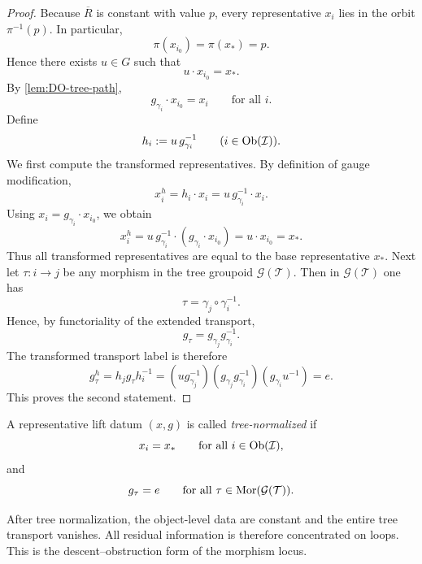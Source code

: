 \begin{proof}
	Because \(\overline R\) is constant with value \(p\), every representative
	\(x_i\) lies in the orbit \(\pi^{-1}(p)\). In particular,
	\[
		\pi(x_{i_0})=\pi(x_*)=p.
	\]
	Hence there exists \(u\in G\) such that
	\[
		u\cdot x_{i_0}=x_*.
	\]
	By \cref{lem:DO-tree-path},
	\[
		g_{\gamma_i}\cdot x_{i_0}=x_i
		\qquad
		\text{for all }i.
	\]
	Define
	\[
		h_i:=u\,g_{\gamma_i}^{-1}
		\qquad
		(i\in\operatorname{Ob}(\mathcal I)).
	\]
	We first compute the transformed representatives. By definition of gauge
	modification,
	\[
		x_i^h=h_i\cdot x_i
		=
		u\,g_{\gamma_i}^{-1}\cdot x_i.
	\]
	Using \(x_i=g_{\gamma_i}\cdot x_{i_0}\), we obtain
	\[
		x_i^h
		=
		u\,g_{\gamma_i}^{-1}\cdot(g_{\gamma_i}\cdot x_{i_0})
		=
		u\cdot x_{i_0}
		=
		x_*.
	\]
	Thus all transformed representatives are equal to the base
	representative \(x_*\).
	Next let \(\tau:i\to j\) be any morphism in the tree groupoid
	\(\mathcal G(\mathcal T)\). Then in \(\mathcal G(\mathcal T)\) one has
	\[
		\tau=\gamma_j\circ \gamma_i^{-1}.
	\]
	Hence, by functoriality of the extended transport,
	\[
		g_\tau=g_{\gamma_j}g_{\gamma_i}^{-1}.
	\]
	The transformed transport label is therefore
	\[
		g_\tau^h
		=
		h_j g_\tau h_i^{-1}
		=
		(u g_{\gamma_j}^{-1})(g_{\gamma_j}g_{\gamma_i}^{-1})(g_{\gamma_i}u^{-1})
		=
		e.
	\]
	This proves the second statement.
\end{proof}
\begin{definition}
	A representative lift datum \((x,g)\) is called
	\emph{tree-normalized} if
	\[
		x_i=x_*
		\qquad
		\text{for all }i\in\operatorname{Ob}(\mathcal I),
	\]
	and
	\[
		g_\tau=e
		\qquad
		\text{for all }\tau\in \mathrm{Mor}(\mathcal G(\mathcal T)).
	\]
\end{definition}
\begin{remark}
	After tree normalization, the object-level data are constant and the
	entire tree transport vanishes. All residual information is therefore
	concentrated on loops. This is the descent--obstruction form of the
	morphism locus.
\end{remark}
